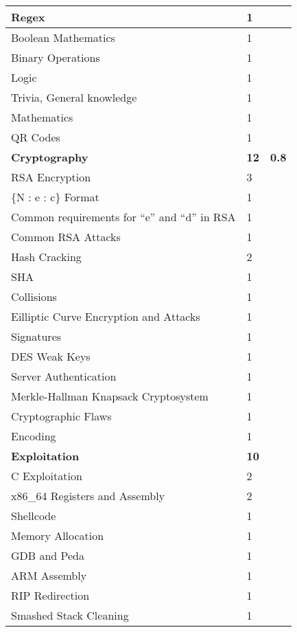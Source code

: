 \documentclass[a4paper,11pt]{report}
\begin{document}
\begin{center}
\begin{longtable}{| l | l | l |}
					\quad Regex & 1 & \\ \hline 
					\quad Boolean Mathematics & 1 & \\ \hline 
					\quad Binary Operations & 1 & \\ \hline 
					\quad Logic & 1 & \\ \hline 
					\quad Trivia, General knowledge & 1 & \\ \hline 
					\quad Mathematics & 1 & \\ \hline 
					\quad QR Codes & 1 & \\ \hline 
					\textbf{Cryptography} & \textbf{12} & \textbf{0.8} \\ \hline 
					\quad RSA Encryption & 3 & \\ \hline
						\qquad \{N : e : c\} Format & 1 & \\ \hline
						\qquad Common requirements for ``e'' and ``d'' in RSA & 1 & \\ \hline
						\qquad Common RSA Attacks & 1 & \\ \hline 
					\quad Hash Cracking & 2 & \\ \hline
						\qquad SHA & 1 & \\ \hline 
						\qquad Collisions & 1 & \\ \hline 
					\quad Eilliptic Curve Encryption and Attacks & 1 & \\ \hline 
					\quad Signatures & 1 & \\ \hline 
					\quad DES Weak Keys & 1 & \\ \hline 
					\quad Server Authentication & 1 & \\ \hline
					\quad Merkle-Hallman Knapsack Cryptosystem & 1 & \\ \hline
					\quad Cryptographic Flaws & 1 & \\ \hline 
					\quad Encoding & 1 & \\ \hline 
					\textbf{Exploitation} & \textbf{10} & \\ \hline
					\quad C Exploitation & 2 & \\ \hline 
					\quad x86\_64 Registers and Assembly & 2 & \\ \hline
					\quad Shellcode & 1 & \\ \hline
					\quad Memory Allocation & 1 & \\ \hline
					\quad GDB and Peda & 1 & \\ \hline
					\quad ARM Assembly & 1 & \\ \hline
					\quad RIP Redirection & 1 & \\ \hline 
					\quad Smashed Stack Cleaning & 1 & \\ \hline 

\end{longtable}
\end{center}
\end{document}
